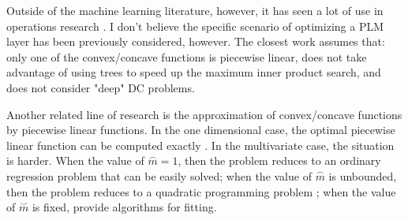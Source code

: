 \documentclass{article}
\newcommand{\w}{\mathbf w}
\newcommand{\f}{f}
\newcommand{\fstar}{\f^*}
\newcommand{\act}{\sigma}
\newcommand{\relu}{\act_R}
\newcommand{\mconvex}{{\stackrel\smile m}}
\newcommand{\mconcave}{{\stackrel\frown m}}
\newcommand{\posp}[1]{{#1}^+}
\newcommand{\negp}[1]{{#1}^-}
\begin{document}
Outside of the machine learning literature, however, it has seen a lot of use in operations research \citep[e.g.][]{tao1997convex,tao2005dc,le2012exact,dinh2014recent,le2015dc,ciripoi2017vector}.
I don't believe the specific scenario of optimizing a PLM layer has been previously considered, however.
The closest work assumes that:
only one of the convex/concave functions is piecewise linear,
does not take advantage of using trees to speed up the maximum inner product search,
and does not consider "deep" DC problems.

Another related line of research is the approximation of convex/concave functions by piecewise linear functions. 
In the one dimensional case, the optimal piecewise linear function can be computed exactly \citep{gavrilovic1975optimal}.
In the multivariate case, the situation is harder.
When the value of $\mconcave=1$, 
then the problem reduces to an ordinary regression problem that can be easily solved;
when the value of $\mconcave$ is unbounded,
then the problem reduces to a quadratic programming problem \citep[][Section 6.5.5]{boyd2004convex};
when the value of $\mconvex$ is fixed,
\citet{magnani2009convex,hannah2013multivariate,balazs2015near,balazs2016max} provide algorithms for fitting.




%
\end{document}
